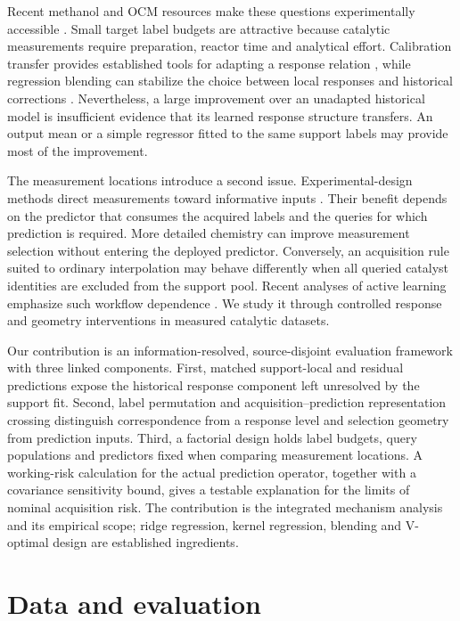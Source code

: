 \documentclass[11pt]{article}
\begin{document}
Recent methanol and OCM resources make these questions experimentally accessible \cite{toldy,yan,suvarna,schmack,mine}. Small target label budgets are attractive because catalytic measurements require preparation, reactor time and analytical effort. Calibration transfer provides established tools for adapting a response relation \cite{feudale}, while regression blending can stabilize the choice between local responses and historical corrections \cite{breiman,efron}. Nevertheless, a large improvement over an unadapted historical model is insufficient evidence that its learned response structure transfers. An output mean or a simple regressor fitted to the same support labels may provide most of the improvement.

The measurement locations introduce a second issue. Experimental-design methods direct measurements toward informative inputs \cite{yubi,gorodetsky2016}. Their benefit depends on the predictor that consumes the acquired labels and the queries for which prediction is required. More detailed chemistry can improve measurement selection without entering the deployed predictor. Conversely, an acquisition rule suited to ordinary interpolation may behave differently when all queried catalyst identities are excluded from the support pool. Recent analyses of active learning emphasize such workflow dependence \cite{nair2026,tang2026}. We study it through controlled response and geometry interventions in measured catalytic datasets.

Our contribution is an information-resolved, source-disjoint evaluation framework with three linked components. First, matched support-local and residual predictions expose the historical response component left unresolved by the support fit. Second, label permutation and acquisition--prediction representation crossing distinguish correspondence from a response level and selection geometry from prediction inputs. Third, a factorial design holds label budgets, query populations and predictors fixed when comparing measurement locations. A working-risk calculation for the actual prediction operator, together with a covariance sensitivity bound, gives a testable explanation for the limits of nominal acquisition risk. The contribution is the integrated mechanism analysis and its empirical scope; ridge regression, kernel regression, blending and V-optimal design are established ingredients.

\section{Data and evaluation}
\end{document}
